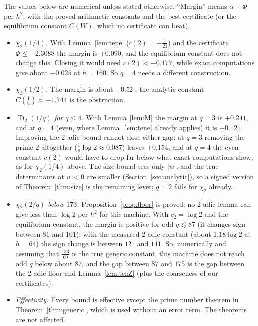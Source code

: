\documentclass[11pt]{amsart}
\theoremstyle{definition}
\theoremstyle{remark}
\numberwithin{equation}{section}
\newcommand{\Ti}{\operatorname{Ti}}
\begin{document}
The values below are numerical unless stated otherwise. ``Margin'' means $\alpha+\Phi$ per $h^2$, with the proved
arithmetic constants and the best certificate (or the equilibrium constant $C(W)$, which no certificate can beat).
\begin{itemize}
\item \emph{$\chi_2(1/4)$.} With Lemma~\ref{lem:tene} ($c(2)=-\frac1{21}$) and the certificate $\Phi\le-2.3088$ the margin is
  $+0.090$, and the equilibrium constant does not change this. Closing it would need $c(2)<-0.177$, while exact
  computations give about $-0.025$ at $h=160$. So $q=4$ needs a different construction.
\item \emph{$\chi_2(1/2)$.} The margin is about $+0.52$ \cite[\S11.4]{Chi2Paper}; the analytic constant $C(\frac14)\approx-1.744$ is
  the obstruction.
\item \emph{$\Ti_2(1/q)$ for $q\le4$.} With Lemma~\ref{lem:M} the margin at $q=3$ is $+0.241$, and at $q=4$ (even, where
Lemma~\ref{lem:tene} already applies) it is $+0.121$. Improving the $2$-adic bound cannot close either gap: at $q=3$
removing the prime $2$ altogether ($\frac18\log2\approx0.087$) leaves $+0.154$, and at $q=4$ the even constant $c(2)$ would
have to drop far below what exact computations show, as for $\chi_2(1/4)$ above. The size bound sees only $|w|$, and the true determinants at $w<0$ are smaller
(Section~\ref{sec:analytic}), so a signed version of Theorem~\ref{thm:size} is the remaining lever; $q=2$ fails for $\chi_2$
already.
\item \emph{$\chi_2(2/q)$ below $173$.} Proposition~\ref{prop:floor} is proved: no $2$-adic lemma can give less than $\log2$
  per $h^2$ for this machine. With $c_2=\log2$ and the equilibrium constant, the margin is positive for odd $q\lesssim87$
  (it changes sign between $81$ and $101$); with the measured $2$-adic constant (about $1.18\log2$ at $h=64$) the sign
  change is between $121$ and $141$. So, numerically and assuming that $\frac{133}{60}$ is the true generic constant,
  this machine does not reach odd $q$ below about $87$, and the gap between $87$ and $175$ is the gap between the $2$-adic
  floor and Lemma~\ref{lem:tenZ} (plus the coarseness of our certificates).
\item \emph{Effectivity.} Every bound is effective except the prime number theorem in Theorem~\ref{thm:generic}, which
  is used without an error term. The theorems are not affected.
\end{itemize}

\end{document}
